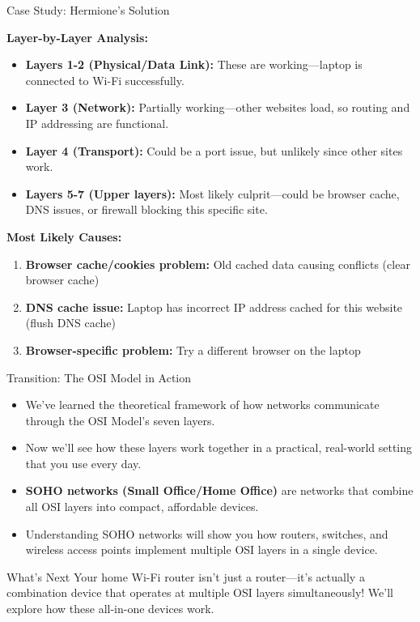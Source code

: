 \documentclass[aspectratio=169]{beamer}
\begin{document}
\begin{frame}{Case Study: Hermione's Solution}

\textbf{Layer-by-Layer Analysis:}
\begin{itemize}
    \item \textbf{Layers 1-2 (Physical/Data Link):} These are working—laptop is connected to Wi-Fi successfully.
    \item \textbf{Layer 3 (Network):} Partially working—other websites load, so routing and IP addressing are functional.
    \item \textbf{Layer 4 (Transport):} Could be a port issue, but unlikely since other sites work.
    \item \textbf{Layers 5-7 (Upper layers):} Most likely culprit—could be browser cache, DNS issues, or firewall blocking this specific site.
\end{itemize}

\vspace{0.3cm}

\textbf{Most Likely Causes:}
\begin{enumerate}
    \item \textbf{Browser cache/cookies problem:} Old cached data causing conflicts (clear browser cache)
    \item \textbf{DNS cache issue:} Laptop has incorrect IP address cached for this website (flush DNS cache)
    \item \textbf{Browser-specific problem:} Try a different browser on the laptop
\end{enumerate}

\end{frame}

\begin{frame}{Transition: The OSI Model in Action}

\begin{itemize}
    \item We've learned the theoretical framework of how networks communicate through the OSI Model's seven layers.
    \item Now we'll see how these layers work together in a practical, real-world setting that you use every day.
    \item \textbf{SOHO networks (Small Office/Home Office)} are networks that combine all OSI layers into compact, affordable devices.
    \item Understanding SOHO networks will show you how routers, switches, and wireless access points implement multiple OSI layers in a single device.
\end{itemize}

\vspace{0.3cm}

\begin{block}{What's Next}
Your home Wi-Fi router isn't just a router—it's actually a combination device that operates at multiple OSI layers simultaneously! We'll explore how these all-in-one devices work.
\end{block}

\end{frame}
\end{document}
